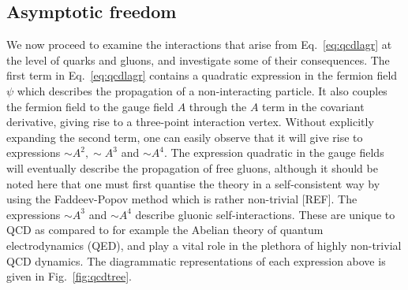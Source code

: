 \documentclass[12pt, a4paper, twoside]{book}
\begin{document}
\subsection{Asymptotic freedom}
We now proceed to examine the interactions that arise from Eq.~\eqref{eq:qcdlagr} at the level of quarks and gluons, and investigate some of their consequences. The first term in Eq.~\eqref{eq:qcdlagr} contains a quadratic expression in the fermion field \(\psi\) which describes the propagation of a non-interacting particle. It also couples the fermion field to the gauge field \(A\) through the \(A\) term in the covariant derivative, giving rise to a three-point interaction vertex. Without explicitly expanding the second term, one can easily observe that it will give rise to expressions \(\sim\!A^2, \sim\!A^3\) and \(\sim\!A^4\). The expression quadratic in the gauge fields will eventually describe the propagation of free gluons, although it should be noted here that one must first quantise the theory in a self-consistent way by using the Faddeev-Popov method which is rather non-trivial [REF]. The expressions \(\sim\!A^3\) and \(\sim\!A^4\) describe gluonic self-interactions. These are unique to QCD as compared to for example the Abelian theory of quantum electrodynamics (QED), and play a vital role in the plethora of highly non-trivial QCD dynamics. The diagrammatic representations of each expression above is given in Fig.~\ref{fig:qcdtree}. 
\end{document}
